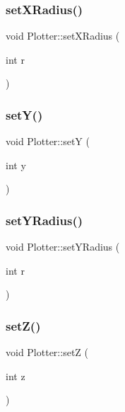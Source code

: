 \mbox{\label{class_plotter_abd1810ebfbc5f3632fb3ad2fbeb28eb4}} 
\subsubsection{\texorpdfstring{set\+X\+Radius()}{setXRadius()}}
{\footnotesize\ttfamily void Plotter\+::set\+X\+Radius (\begin{DoxyParamCaption}\item[{int}]{r }\end{DoxyParamCaption})}

\mbox{\label{class_plotter_a586a5dc38bee3fdd3d89889f3c322fbc}} 
\subsubsection{\texorpdfstring{set\+Y()}{setY()}}
{\footnotesize\ttfamily void Plotter\+::setY (\begin{DoxyParamCaption}\item[{int}]{y }\end{DoxyParamCaption})}

\mbox{\label{class_plotter_aedf70b23a2128f7438500f9abfe9a88c}} 
\subsubsection{\texorpdfstring{set\+Y\+Radius()}{setYRadius()}}
{\footnotesize\ttfamily void Plotter\+::set\+Y\+Radius (\begin{DoxyParamCaption}\item[{int}]{r }\end{DoxyParamCaption})}

\mbox{\label{class_plotter_af71ca471de0dbf45efd7467662a74bb6}} 
\subsubsection{\texorpdfstring{set\+Z()}{setZ()}}
{\footnotesize\ttfamily void Plotter\+::setZ (\begin{DoxyParamCaption}\item[{int}]{z }\end{DoxyParamCaption})}

